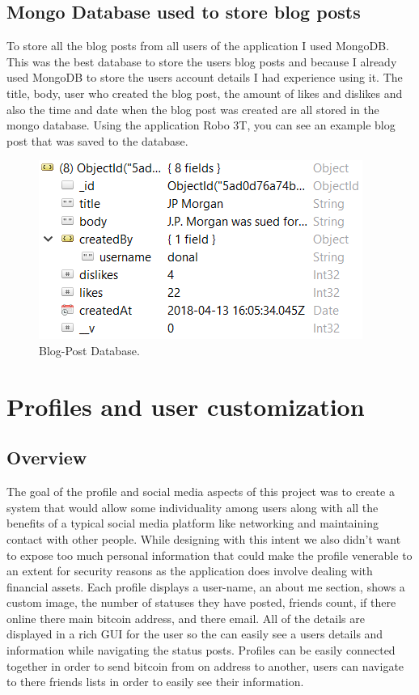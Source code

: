 \subsection{Mongo Database used to store blog posts}
To store all the blog posts from all users of the application I used MongoDB. This was the best database to store the users blog posts and because I already used MongoDB to store the users account details I had experience using it. The title, body, user who created the blog post, the amount of likes and dislikes and also the time and date when the blog post was created are all stored in the mongo database. Using the application Robo 3T, you can see an example blog post that was saved to the database.

\begin{figure}[H]
\centering
\includegraphics{img/blogpost-database.png}
\caption{Blog-Post Database.}
\end{figure}



\section{Profiles and user customization}

\subsection{Overview}
The goal of the profile and social media aspects of this project was to create a system that would allow some individuality among users along with all the benefits of a typical social media platform like networking and maintaining contact with other people. While designing with this intent we also didn't want to expose too much personal information that could make the profile venerable to an extent for security reasons as the application does involve dealing with financial assets. Each profile displays a user-name, an about me section, shows a custom image, the number of statuses they have posted, friends count, if there online there main bitcoin address, and there email. All of the details are displayed in a rich GUI for the user so the can easily see a users details and information while navigating the status posts. Profiles can be easily connected together in order to send bitcoin from on address to another, users can navigate to there friends lists in order to easily see their information.

